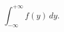 \documentclass{article}
\newcommand{\inftyint}{\int_{-\infty}^{+\infty}}
\begin{document}
\[ \inftyint f(y)\,dy.\]
\end{document}
